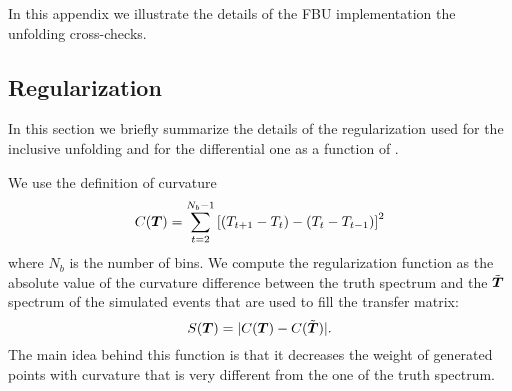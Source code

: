 In this appendix we illustrate the details of the FBU implementation
the unfolding cross-checks.

\subsection{Regularization}
\label{sec:app:unfolding:regularization}
In this section we briefly summarize the details of the regularization
used for the inclusive unfolding and for the differential one as a
function of \pttt{}.

We use the definition of curvature
%
\begin{equation}
        C(\boldsymbol{T}{}) =
        \sum_{t=2}^{N_b-1}\left[(T_{t+1}-T_{t})-(T_t-T_{t-1})\right]^2
\end{equation}
%
where $N_b$ is the number of bins. We compute the regularization
function as the absolute value of the curvature difference between the
truth spectrum and the $\tilde{\boldsymbol{T}{}}$ spectrum of the simulated
events that are used to fill the transfer matrix:
%
\begin{equation}
 S(\boldsymbol{T}{}) = |C(\boldsymbol{T}) - C(\tilde{\boldsymbol{T}{}})|.
\end{equation}
%
The main idea behind this function is that it decreases the weight of
generated points \Truth{} with curvature that is very different from
the one of the truth spectrum.

